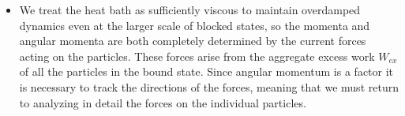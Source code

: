 \documentclass[12pt,letterpaper]{article}
\begin{document}
\begin{itemize}
\item We treat the heat bath as sufficiently viscous to maintain overdamped dynamics even at the larger scale of blocked states, so the momenta and angular momenta are both completely determined by the current forces acting on the particles. These forces arise from the aggregate excess work $W_{ex}$ of all the particles in the bound state. Since angular momentum is a factor it is necessary to track the directions of the forces, meaning that we must return to analyzing in detail the forces on the individual particles.


\end{itemize}
\end{document}
